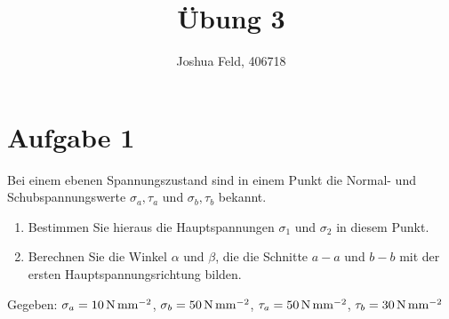 \documentclass{exercise}
\institute{Lehr- und Forschungsgebiet Kontinuumsmechanik}
\title{Übung 3}
\author{Joshua Feld, 406718}
\begin{document}
    \maketitle


    \section*{Aufgabe 1}

    \begin{problem}
        Bei einem ebenen Spannungszustand sind in einem Punkt die Normal- und Schubspannungswerte \(\sigma_a, \tau_a\) und \(\sigma_b, \tau_b\) bekannt.
        \begin{enumerate}
            \item Bestimmen Sie hieraus die Hauptspannungen \(\sigma_1\) und \(\sigma_2\) in diesem Punkt.
            \item Berechnen Sie die Winkel \(\alpha\) und \(\beta\), die die Schnitte \(a-a\) und \(b-b\) mit der ersten Hauptspannungsrichtung bilden.
        \end{enumerate}
        Gegeben: \(\sigma_a = 10\,\si{\newton\per\milli\meter\squared}\), \(\sigma_b = 50\,\si{\newton\per\milli\meter\squared}\), \(\tau_a = 50\,\si{\newton\per\milli\meter\squared}\), \(\tau_b = 30\,\si{\newton\per\milli\meter\squared}\)
    \end{problem}
\end{document}
